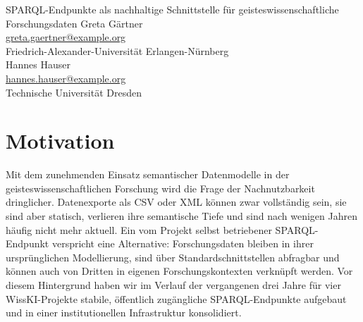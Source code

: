 \graphicspath{{abstracts/praesentationen/04-sparql-endpunkte/img/}{img/}}

\begin{beitrag}{SPARQL-Endpunkte als nachhaltige Schnittstelle für geisteswissenschaftliche Forschungsdaten}{%
Greta Gärtner\, \\
\small \href{mailto:greta.gaertner@example.org}{greta.gaertner@example.org} \\
\small Friedrich-Alexander-Universität Erlangen-Nürnberg \\[0.5cm]
Hannes Hauser\, \\
\small \href{mailto:hannes.hauser@example.org}{hannes.hauser@example.org} \\
\small Technische Universität Dresden
}

\begin{abstract}
Der Beitrag berichtet über Aufbau und Betrieb stabiler, öffentlich zugänglicher SPARQL-Endpunkte für vier WissKI-Projekte über drei Jahre: Die Architektur trennt die redaktionelle WissKI-Instanz strikt vom Veröffentlichungsindex (NGINX, OpenLink Virtuoso, Apache Airflow), der automatisch mit VoID-Beschreibungen und DataCite-konformen Metadaten versehen wird. Das Service-Modell kommuniziert Verfügbarkeit als "best effort with disclosure" und überwacht kritische Schwellenwerte mit Prometheus. Nach drei Betriebsjahren zeigt sich, dass SPARQL-Endpunkte ebenso als didaktisches Werkzeug wie als Forschungsschnittstelle genutzt werden und der Aufwand für den Eigenbetrieb geringer ist als oft angenommen.
\end{abstract}

\section{Motivation}
Mit dem zunehmenden Einsatz semantischer Datenmodelle in der geisteswissenschaftlichen Forschung wird die Frage der Nachnutzbarkeit dringlicher. Datenexporte als CSV oder XML können zwar vollständig sein, sie sind aber statisch, verlieren ihre semantische Tiefe und sind nach wenigen Jahren häufig nicht mehr aktuell. Ein vom Projekt selbst betriebener SPARQL-Endpunkt verspricht eine Alternative: Forschungsdaten bleiben in ihrer ursprünglichen Modellierung, sind über Standardschnittstellen abfragbar und können auch von Dritten in eigenen Forschungskontexten verknüpft werden. Vor diesem Hintergrund haben wir im Verlauf der vergangenen drei Jahre für vier WissKI-Projekte stabile, öffentlich zugängliche SPARQL-Endpunkte aufgebaut und in einer institutionellen Infrastruktur konsolidiert.


\end{beitrag}
